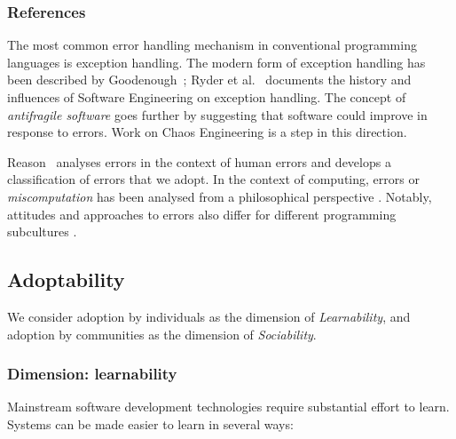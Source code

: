 \documentclass[english,submission]{programming}
\providecommand{\DIFaddbegin}{} %
\providecommand{\DIFaddend}{} %
\providecommand{\DIFdelbegin}{} %
\providecommand{\DIFdelend}{} %
\begin{document}
\DIFdelbegin %
\DIFdelend \DIFaddbegin \hypertarget{references-3}{%
\subsubsection{References}\label{references-3}}
\DIFaddend 

The most common error handling mechanism in conventional programming
languages is exception handling. The modern form of exception handling
has been described by Goodenough~\cite{ExceptionHandling}; Ryder et
al.~\cite{SweImpact} documents the history and influences of Software
Engineering on exception handling. The concept of \emph{antifragile
software} \cite{Antifragile} goes further by suggesting that software
could improve in response to errors. Work on Chaos Engineering
\cite{ChaosMonkey} is a step in this direction.

Reason~\cite{HumanError} analyses errors in the context of human errors
and develops a classification of errors that we adopt. In the context of
computing, errors or \emph{miscomputation} has been analysed from a
philosophical perspective \cite{Miscomputation,MalfunctioningSW}.
Notably, attitudes and approaches to errors also differ for different
programming subcultures \cite{LivingWithErrors}.

\hypertarget{adoptability}{%
\subsection{Adoptability}\label{adoptability}}


We consider adoption by individuals as the dimension of
\emph{Learnability}, and adoption by communities as the dimension of
\emph{Sociability}.

\hypertarget{dimension-learnability}{%
\subsubsection{Dimension: learnability}\label{dimension-learnability}}

Mainstream software development technologies require substantial effort
to learn. Systems can be made easier to learn in several ways:
\end{document}
